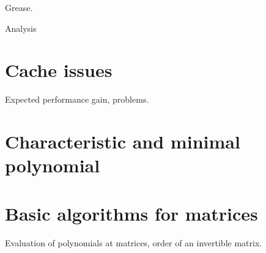 Grease.

Analysis


\section{Cache issues}
\label{sec:cache}

Expected performance gain, problems.

\section{Characteristic and minimal polynomial}
\label{sec:charminpoly}

\section{Basic algorithms for matrices}
\label{sec:basalgmat}

Evaluation of polynomials at matrices, order of an invertible matrix.

